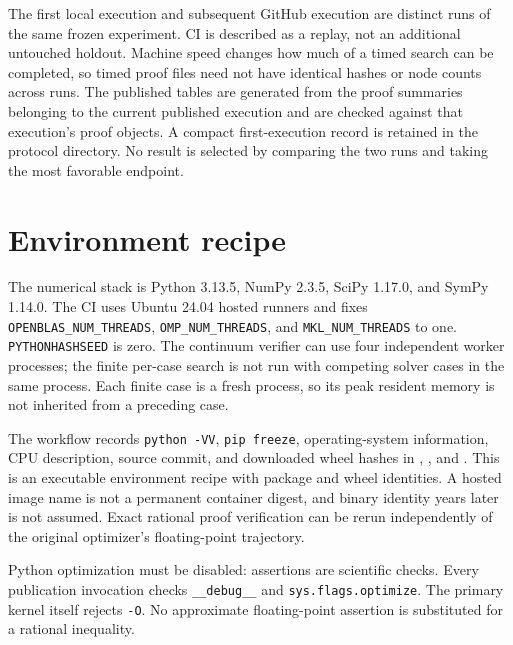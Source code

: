The first local execution and subsequent GitHub execution are distinct runs of the same frozen experiment. CI is described as a replay, not an additional untouched holdout. Machine speed changes how much of a timed search can be completed, so timed proof files need not have identical hashes or node counts across runs. The published tables are generated from the proof summaries belonging to the current published execution and are checked against that execution's proof objects. A compact first-execution record is retained in the protocol directory. No result is selected by comparing the two runs and taking the most favorable endpoint.

\section{Environment recipe}
The numerical stack is Python 3.13.5, NumPy 2.3.5, SciPy 1.17.0, and SymPy 1.14.0. The CI uses Ubuntu 24.04 hosted runners and fixes \texttt{OPENBLAS\_NUM\_THREADS}, \texttt{OMP\_NUM\_THREADS}, and \texttt{MKL\_NUM\_THREADS} to one. \texttt{PYTHONHASHSEED} is zero. The continuum verifier can use four independent worker processes; the finite per-case search is not run with competing solver cases in the same process. Each finite case is a fresh process, so its peak resident memory is not inherited from a preceding case.

The workflow records \texttt{python -VV}, \texttt{pip freeze}, operating-system information, CPU description, source commit, and downloaded wheel hashes in , , and . This is an executable environment recipe with package and wheel identities. A hosted image name is not a permanent container digest, and binary identity years later is not assumed. Exact rational proof verification can be rerun independently of the original optimizer's floating-point trajectory.

Python optimization must be disabled: assertions are scientific checks. Every publication invocation checks \texttt{\_\_debug\_\_} and \texttt{sys.flags.optimize}. The primary kernel itself rejects \texttt{-O}. No approximate floating-point assertion is substituted for a rational inequality.

